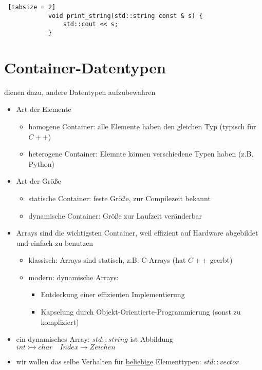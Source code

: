 \documentclass{article}
\begin{document}
\begin{itemize}
	 	\begin{lstlisting} [tabsize = 2]
	 		void print_string(std::string const & s) {
		 		std::cout << s;
	 		}
	 	\end{lstlisting}
	 \end{itemize}
	 
	 \section{Container-Datentypen}
	 dienen dazu, andere Datentypen aufzubewahren
	 \begin{itemize}
	 	\item Art der Elemente
	 	\begin{itemize}
		 	\item homogene Container: alle Elemente haben den gleichen Typ (typisch für $C++$)
		 	\item heterogene Container: Elemnte können verschiedene Typen haben (z.B. Python)
	 	\end{itemize}
	 	\item Art der Größe
	 	\begin{itemize}
	 		\item statische Container: feste Größe, zur Compilezeit bekannt
	 		\item dynamische Container: Größe zur Laufzeit veränderbar
	 	\end{itemize}
	 	\item Arrays sind die wichtigsten Container, weil effizient auf Hardware abgebildet und einfach zu benutzen
	 	\begin{itemize}
	 		\item klassisch: Arrays sind statisch, z.B. C-Arrays (hat $C++$ geerbt)
	 		\item modern: dynamische Arrays:
	 		\begin{itemize}
	 			\item Entdeckung einer effizienten Implementierung
	 			\item Kapselung durch Objekt-Orientierte-Programmierung (sonst zu kompliziert)
	 		\end{itemize}
	 	\end{itemize}
	 	\item ein dynamisches Array: $std::string$ ist Abbildung $int \rightarrowtail char \quad Index \rightarrow Zeichen$
	 	\item wir wollen das selbe Verhalten für \underline{beliebige} Elementtypen: $std::vector$
	 \end{itemize}
	 	
\end{document}

